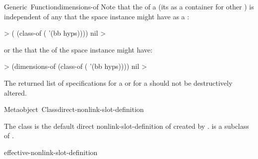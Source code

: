 \documentclass[10pt,twoside,english,pdftex]{article}
\begin{document}
\begin{functiondoc}{Generic~Function}{dimensions-of}
%
%
Note that the  of a  (its
 as a container for other ) is
independent of any  that the space instance might have
as a :
%
%
\W\supp
\begin{example}
  > ( (class-of ( '(bb hyps))))
  nil
  >
\end{example}
%
or the  that the  of the space instance
might have:
%
\W\supp\notpretop
\begin{example}
  > (dimensions-of (class-of ( '(bb hyps))))
  nil
  >
\end{example}

\fnnote The returned list of  specifications for a
 or for a  should not be destructively
altered.

\end{functiondoc}


\begin{functiondoc}{Metaobject~Class}{direct-nonlink-slot-definition}{}
%

\fnsyntax

\fnpackage {}

\fnmodule {}

\fndescription The class  is the
default direct nonlink-slot-definition  of
 created by
.
 is a subclass of
.

\begin{alsos}{effective-nonlink-slot-definition}
\end{alsos}

\end{functiondoc}

\end{document}
